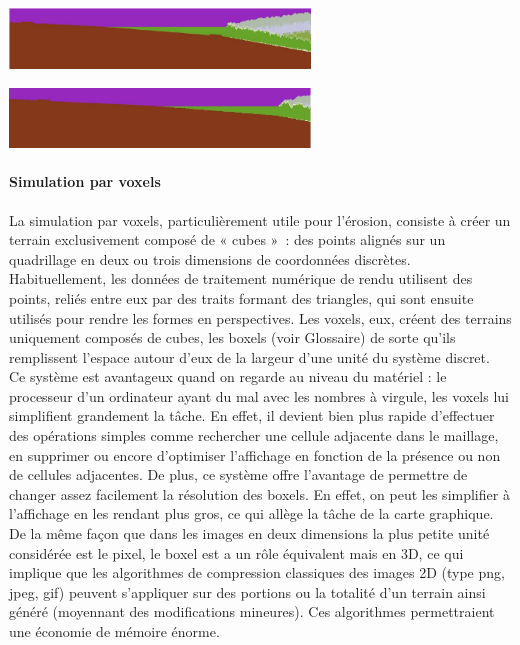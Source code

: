 \documentclass[a4paper,11pt]{article}
\begin{document}
\begin{center}
  \includegraphics[width=8cm]{Images/3100_cell.png}
\end{center}
\begin{center}
  \includegraphics[width=8cm]{Images/7100_cell.png}
\end{center}

\paragraph{Simulation par voxels}
\medbreak
La simulation par voxels, particulièrement utile pour l'érosion, consiste à créer un terrain exclusivement composé de « cubes »~: des points alignés sur un quadrillage en deux ou trois dimensions de coordonnées discrètes.\\
Habituellement, les données de traitement numérique de rendu utilisent des points, reliés entre eux par des traits formant des triangles, qui sont ensuite utilisés pour rendre les formes en perspectives. Les voxels, eux, créent des terrains uniquement composés de cubes, les boxels (voir Glossaire) de sorte qu'ils remplissent l'espace autour d'eux de la largeur d'une unité du système discret.\\
Ce système est avantageux quand on regarde au niveau du matériel : le processeur d'un ordinateur ayant du mal avec les nombres à virgule, les voxels lui simplifient grandement la tâche.
En effet, il devient bien plus rapide d'effectuer des opérations simples comme rechercher une cellule adjacente dans le maillage, en supprimer ou encore d'optimiser l'affichage en fonction de la présence ou non de cellules adjacentes.
De plus, ce système offre l'avantage de permettre de changer assez facilement la résolution des boxels.
En effet, on peut les simplifier à l'affichage en les rendant plus gros, ce qui allège la tâche de la carte graphique.
De la même façon que dans les images en deux dimensions la plus petite unité considérée est le pixel, le boxel est a un rôle équivalent mais en 3D, ce qui implique que les algorithmes de compression classiques des images 2D (type png, jpeg, gif) peuvent s'appliquer sur des portions ou la totalité d'un terrain ainsi généré (moyennant des modifications mineures). Ces algorithmes permettraient une économie de mémoire énorme.\\
\end{document}
